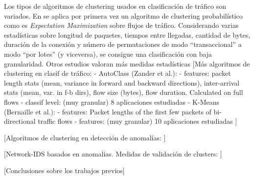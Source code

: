 Los tipos de algoritmos de clustering usados en clasificación de tráfico son variados.
En \cite{MHL+04} se aplica por primera vez un algoritmo de clustering probabilístico como es \emph{Expectation Maximization} sobre flujos de tráfico.
Considerando varias estadísticas sobre longitud de paquetes, tiempos entre llegadas, cantidad de bytes, duración de la conexión y número de permutaciones de modo ``transaccional'' a modo ``por lotes'' (y viceversa),
se consigue una clasificación con baja granularidad.
Otros estudios valoran más medidas estadísticas
[Más algoritmos de clustering en clasif de tráfico:
- AutoClass (Zander et al.):
    - features: packet length stats (mean, variance in forward and backward directions), inter-arrival stats (mean, var. in f-b dirs), flow size (bytes), flow duration. Calculated on full flows
    - classif level: (muy granular) 8 aplicaciones estudiadas
- K-Means (Bernaille et al.):
    - features: Packet lengths of the first few packets of bi-directional traffic flows
    - features: (muy granular) 10 aplicaciones estudiadas
]

[Algoritmos de clustering en detección de anomalías:
\cite{Syarif_2012} %
\cite{Leung_2005} %
\cite{Kim_2018} %
]

[Network-IDS basados en anomalías. Medidas de validación de clusters:
\cite{Bhuyan_2014} %
]

[Conclusiones sobre los trabajos previos]
